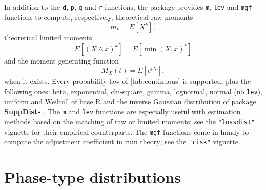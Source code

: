 \documentclass[x11names]{article}
\newcommand{\E}[1]{E[ #1 ]}
\newcommand{\proglang}[1]{\textsf{#1}}
\newcommand{\pkg}[1]{\textbf{#1}}
\newcommand{\code}[1]{\texttt{#1}}
\begin{document}
In addition to the \code{d}, \code{p}, \code{q} and \code{r}
functions, the package provides \code{m}, \code{lev} and \code{mgf}
functions to compute, respectively, theoretical raw moments
\begin{equation}
  \label{eq:def:moment}
  m_k = \E{X^k},
\end{equation}
theoretical limited moments
\begin{equation}
  \label{eq:def:limited-moment}
  \E{(X \wedge x)^k} = \E{\min(X, x)^k}
\end{equation}
and the moment generating function
\begin{equation}
  \label{eq:def:mgf}
  M_X(t) = \E{e^{tX}},
\end{equation}
when it exists. Every probability law of \autoref{tab:continuous}
is supported, plus the following ones: beta, exponential, chi-square,
gamma, lognormal, normal (no \code{lev}), uniform and Weibull of base
\proglang{R} and the inverse Gaussian distribution of package
\pkg{SuppDists} \citep{SuppDists}. The \code{m} and \code{lev}
functions are especially useful with estimation methods based on the
matching of raw or limited moments; see the \code{"lossdist"} vignette
for their empirical counterparts. The \code{mgf} functions come in
handy to compute the adjustment coefficient in ruin theory; see the
\code{"risk"} vignette.


\section{Phase-type distributions}
\label{sec:phase-type}
\end{document}
